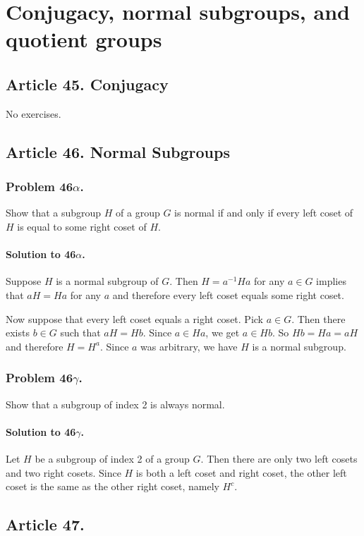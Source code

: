 \section{Conjugacy, normal subgroups, and quotient groups}


\subsection{Article 45. Conjugacy}

No exercises.

\subsection{Article 46. Normal Subgroups}
\subsubsection{Problem 46$\alpha$.}
Show that a subgroup $H$ of a group $G$ is normal if and only if every left
coset of $H$ is equal to some right coset of $H$.

\paragraph*{Solution to 46$\alpha$.}
Suppose $H$ is a normal subgroup of $G$. Then $H = a^{-1}Ha$ for any $a \in G$
implies that $aH = Ha$ for any $a$ and therefore every left coset equals some
right coset.

Now suppose that every left coset equals a right coset. Pick $a \in G$. Then
there exists $b \in G$ such that $aH = Hb$. Since $a \in Ha$, we get $a \in Hb$.
So $Hb = Ha = aH$ and therefore $H = H^a$. Since $a$ was arbitrary, we have
$H$ is a normal subgroup.

\subsubsection{Problem 46$\gamma$.}
Show that a subgroup of index 2 is always normal.

\paragraph*{Solution to 46$\gamma$.}
Let $H$ be a subgroup of index 2 of a group $G$. Then there are only two left
cosets and two right cosets. Since $H$ is both a left coset and right coset,
the other left coset is the same as the other right coset, namely $H^c$.

\subsection{Article 47.}
